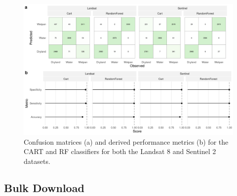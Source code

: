 \documentclass[abstract=on,10pt,a4paper,bibliography=totocnumbered]{article}
\begin{document}
\begin{figure}[htbp]
 \begin{center}
  \includegraphics[width = \textwidth]{Figures/ClassificationValidation.png}
  \caption{Confusion matrices (a) and derived performance metrics (b) for the
  CART and RF classifiers for both the Landsat 8 and Sentinel 2 datasets.}
  \label{ClassificationValidation}
 \end{center}
\end{figure}

\subsection{Bulk Download}
\end{document}
